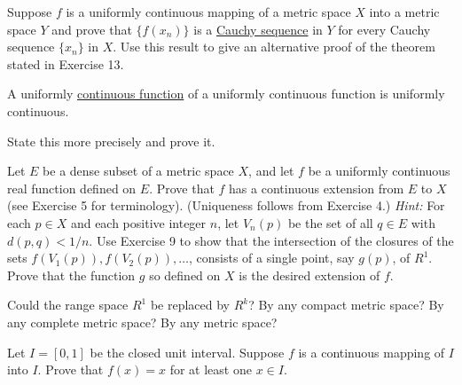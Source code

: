  \begin{exercise}[Rudin 4.11]
    Suppose $f$ is a uniformly continuous mapping of a metric space $X$ into a metric space $Y$ and prove that $\{f(x_n)\}$ is a \hyperref[def:cauchy-sequence]{Cauchy sequence} in $Y$ for every Cauchy sequence $\{x_n\}$ in $X$. Use this result to give an alternative proof of the theorem stated in Exercise 13.
  \end{exercise}
  \begin{solution}

  \end{solution}

  \begin{exercise}[Rudin 4.12]
    A uniformly \hyperref[pst-def:continuous_func]{continuous function} of a uniformly continuous function is uniformly continuous.
    \par State this more precisely and prove it.
  \end{exercise}
  \begin{solution}

  \end{solution}

  \begin{exercise}[Rudin 4.13]
    Let $E$ be a dense subset of a metric space $X$, and let $f$ be a uniformly continuous real function defined on $E$. Prove that $f$ has a continuous extension from $E$ to $X$ (see Exercise 5 for terminology). (Uniqueness follows from Exercise 4.) \textit{Hint:} For each $p \in X$ and each positive integer $n$, let $V_n(p)$ be the set of all $q \in E$ with $d(p, q) < 1/n$. Use Exercise 9 to show that the intersection of the closures of the sets $f(V_1(p)), f(V_2(p)), \dots$, consists of a single point, say $g(p)$, of $R^1$. Prove that the function $g$ so defined on $X$ is the desired extension of $f$.
    \par Could the range space $R^1$ be replaced by $R^k$? By any compact metric space? By any complete metric space? By any metric space?
  \end{exercise}
  \begin{solution}

  \end{solution}

  \begin{exercise}[Rudin 4.14]
    Let $I = [0, 1]$ be the closed unit interval. Suppose $f$ is a continuous mapping of $I$ into $I$. Prove that $f(x) = x$ for at least one $x \in I$.
  \end{exercise}
  \begin{solution}

  \end{solution}


